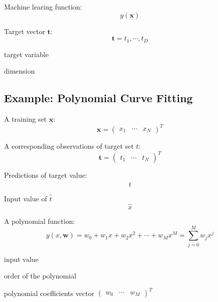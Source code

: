 \documentclass[11pt, a4paper, oneside]{book}
\begin{document}
\bigskip

\noindent
Machine learing function:
$$
y(\mathbf{x})
$$

\bigskip

\noindent
Target vector $\mathbf{t}$:
$$
\mathbf{t} = { t_1, \cdots , t_D }
$$
\begin{description}[labelwidth=\widthof{\bfseries 1234567890},align=parright]
	\item[$t:$] target variable
	\item[$D:$] dimension
\end{description}

\bigskip

\subsection{Example: Polynomial Curve Fitting}

\noindent
A training set $\mathbf{x}$:
$$
\mathbf{x}
= \begin{pmatrix}
x_1 & \cdots & x_N
\end{pmatrix} ^T 
$$

\bigskip

\noindent
A corresponding observations of target set $t$:
$$
\mathbf{t}
	= \begin{pmatrix}
	t_1 & \cdots & t_N
\end{pmatrix} ^T 
$$

\bigskip

\noindent
Predictions of target value:
$$
\hat{t}
$$

\bigskip

\noindent
Input value of $\hat{t}$
$$
\hat{x}
$$

\bigskip

\noindent
A polynomial function:
\begin{equation}
y(x, \mathbf{w})
= w_0 + w_1x + w_2x^2 + \cdots + w_Mx^M
= \sum_{j=0}^M w_j x^j 
\tag{1.1}
\end{equation}

\begin{description}[labelwidth=\widthof{\bfseries 1234567890},align=parright]
	\item[$x:$] input value
	\item[$M:$] order of the polynomial
	\item[$\mathbf{w}:$] polynomial coefficients vector $\begin{pmatrix}
w_0 & \cdots & w_M
\end{pmatrix}^T$
\end{description}
\end{document}
